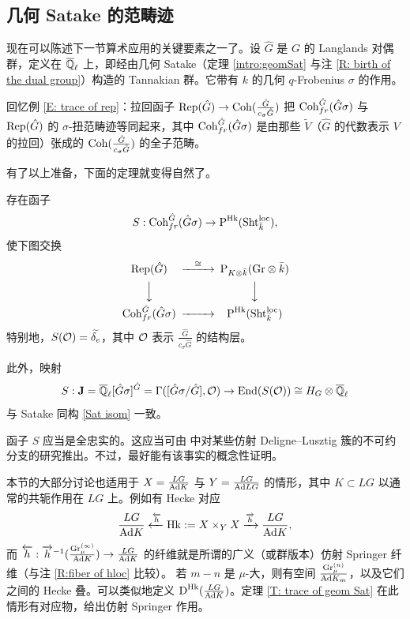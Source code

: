 \subsection{几何 Satake 的范畴迹}
现在可以陈述下一节算术应用的关键要素之一了。设 $\hat G$ 是 $G$ 的 Langlands 对偶群，定义在 ${\overline{{\mathbb Q}}_\ell}$ 上，即经由几何 Satake（定理 \ref{intro:geomSat} 与注 \ref{R: birth of the dual group}）构造的 Tannakian 群。它带有 $k$ 的几何 $q$-Frobenius $\sigma$ 的作用。

回忆例 \ref{E: trace of rep}：拉回函子 $\operatorname{Rep}(\hat G)\to {\operatorname{Coh}}(\frac{\hat G}{c_\sigma\hat G})$ 把 ${\operatorname{Coh}}_{fr}^{\hat G}(\hat G\sigma)$ 与 $\operatorname{Rep}(\hat G)$ 的 $\sigma$-扭范畴迹等同起来，其中 ${\operatorname{Coh}}_{fr}^{\hat G}(\hat G\sigma)$ 是由那些 $\widetilde{V}$（$\hat G$ 的代数表示 $V$ 的拉回）张成的 ${\operatorname{Coh}}(\frac{\hat G}{c_\sigma\hat G})$ 的全子范畴。

有了以上准备，下面的定理就变得自然了。
\begin{thm}
\label{T: trace of geom Sat}
存在函子
\[S: {\operatorname{Coh}}_{fr}^{\hat G}(\hat G\sigma)\to \operatorname{P}^{{\operatorname{Hk}}}(\operatorname{Sht}^{\mathrm{loc}}_{\bar k}),\]
使下图交换
\[
\begin{CD}
\on{Rep}(\hat G)@>\cong>>\on{P}_{K\otimes \bar k}(\Gr\otimes \bar k)\\
@VVV@VVV\\
\Coh_{fr}^{\hat G}(\hat G\sigma)@>>> \on{P}^{\Hk}(\Sht^\loc_{\bar k})
\end{CD}
\]
特别地，$S({\mathcal O})=\widetilde{\delta_e}$，其中 ${\mathcal O}$ 表示 $\frac{\hat G}{c_\sigma \hat G}$ 的结构层。

此外，映射
\[S: \mathbf J={\overline{{\mathbb Q}}_\ell}[\hat G\sigma]^{\hat G}=\Gamma([\hat G\sigma/\hat G],{\mathcal O})\to {\operatorname{End}}(S({\mathcal O}))\cong H_G\otimes {\overline{{\mathbb Q}}_\ell}\]
与 Satake 同构 \eqref{Sat isom} 一致。
\end{thm}

\begin{rmk}
函子 $S$ 应当是全忠实的。这应当可由 \cite[\S 4]{XZ} 中对某些仿射 Deligne–Lusztig 簇的不可约分支的研究推出。不过，最好能有该事实的概念性证明。
\end{rmk}

\begin{rmk}
\label{R:affine springer}
本节的大部分讨论也适用于
$X=\frac{LG}{{\operatorname{Ad}} K}$ 与 $Y=\frac{LG}{{\operatorname{Ad}} LG}$ 的情形，其中 $K\subset LG$ 以通常的共轭作用在 $LG$ 上。例如有 Hecke 对应
\[\frac{LG}{{\operatorname{Ad}} K}\xleftarrow{\overleftarrow{h}}{\operatorname{Hk}}:= X\times_YX\xrightarrow{\overrightarrow{h}}\frac{LG}{{\operatorname{Ad}} K},\]
而 $\overleftarrow{h}: \overrightarrow{h}^{-1}(\frac{{\operatorname{Gr}}_\mu^{(\infty)}}{{\operatorname{Ad}} K})\to \frac{LG}{{\operatorname{Ad}} K}$ 的纤维就是所谓的广义（或群版本）仿射 Springer 纤维（与注 \ref{R:fiber of hloc} 比较）。
若 $m-n$ 是 $\mu$-大，则有空间
$\frac{{\operatorname{Gr}}_\mu^{(n)}}{{\operatorname{Ad}} K_m}$，以及它们之间的 Hecke 叠。可以类似地定义 $\operatorname{D}^{{\operatorname{Hk}}}(\frac{LG}{{\operatorname{Ad}} K})$。定理 \ref{T: trace of geom Sat} 在此情形有对应物，给出仿射 Springer 作用。
\end{rmk}

